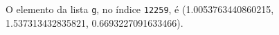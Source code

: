 \documentclass[12pt,varwidth=16cm,border=1pt]{standalone}
\begin{document}
O elemento da lista \verb+g+, no índice \verb+12259+, é (1.0053763440860215, 1.537313432835821, 0.6693227091633466).

\questiomfalse
\end{document}
